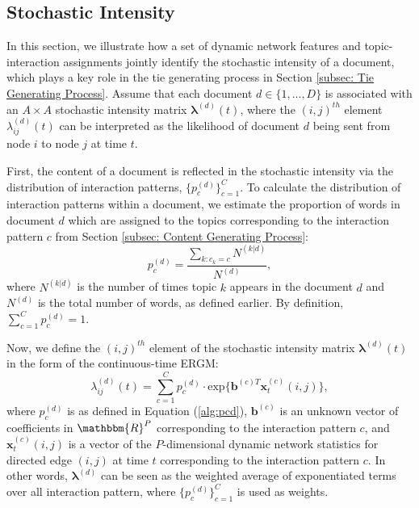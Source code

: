 \subsection{Stochastic Intensity} \label{subsec: Stochastic Intensity}
In this section, we illustrate how a set of dynamic network features and topic-interaction assignments jointly identify the stochastic intensity of a document, which plays a key role in the tie generating process in Section \ref{subsec: Tie Generating Process}. Assume that each document $d \in \{1,...,D\}$ is associated with an $A\times A$ stochastic intensity matrix $\boldsymbol{\lambda}^{(d)}(t)$, where the $(i, j)^{th}$ element $\lambda^{(d)}_{ij}(t)$ can be interpreted as the likelihood of document $d$ being sent from node $i$ to node $j$ at time $t$.  

First, the content of a document is reflected in the stochastic intensity via the distribution of interaction patterns, $\{p_c^{(d)}\}_{c=1}^C$. To calculate the distribution of interaction patterns within a document, we estimate the proportion of words in document $d$ which are assigned to the topics corresponding to the interaction pattern $c$ from Section \ref{subsec: Content Generating Process}: 
\begin{equation}
p_c^{(d)} = \frac{\sum\limits_{k: c_k=c} N^{(k|d)}}{N^{(d)}},
	\label{alg:pcd}
\end{equation}
where $N^{(k|d)}$ is the number of times topic $k$ appears in the document $d$ and $N^{(d)}$ is the total number of words, as defined earlier. By definition, $\sum\limits_{c=1}^{C}p_c^{(d)}=1$.

Now, we define the $(i, j)^{th}$ element of the stochastic intensity matrix $\boldsymbol{\lambda}^{(d)}(t)$ in the form of the continuous-time ERGM:
\begin{equation}
\lambda^{(d)}_{ij}(t)=\sum\limits_{c=1}^{C} p^{(d)}_c
\cdot  \mbox{exp}\Big\{\boldsymbol{b}^{(c)T}\boldsymbol{x}^{(c)}_t(i, j)\Big\},
	\label{alg:lambdad}
\end{equation}
where $p_c^{(d)}$ is as defined in Equation (\ref{alg:pcd}), $\boldsymbol{b}^{(c)}$ is an unknown vector of coefficients in $\mathbbm{R}^{P}$ corresponding to the interaction pattern $c$, and $\boldsymbol{x}^{(c)}_t(i, j)$ is a vector of the $P$-dimensional dynamic network statistics for directed edge $(i, j)$ at time $t$ corresponding to the interaction pattern $c$. In other words, $\boldsymbol{\lambda}^{(d)}$ can be seen as the weighted average of exponentiated terms over all interaction pattern, where $\{p_c^{(d)}\}_{c=1}^C$ is used as weights. 

